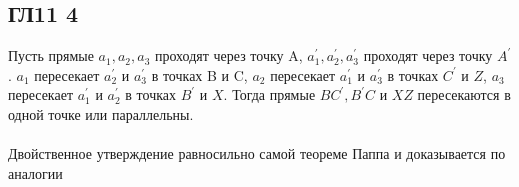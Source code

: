 \subsection*{ГЛ11 4}
Пусть прямые  $a_1,a_2,a_3$ проходят через точку A,  $a_1^{\prime},a_2^{\prime},a_3^{\prime}$ проходят через точку $A^{\prime}$.  $a_1$ пересекает  $a_2^{\prime}$ и  $a_3^{\prime}$ в точках B и C,  $a_2$ пересекает  $a_1^{\prime}$ и  $a_3^{\prime}$ в точках $C^{\prime}$ и $Z$,  $a_3$ пересекает  $a_1^{\prime}$ и  $a_2^{\prime}$ в точках $B^{\prime}$ и $X$. Тогда прямые $BC^{\prime}, B^{\prime}C$ и $XZ$ пересекаются в одной точке или параллельны.\\
\\
Двойственное утверждение равносильно самой теореме Паппа и доказывается по аналогии
		